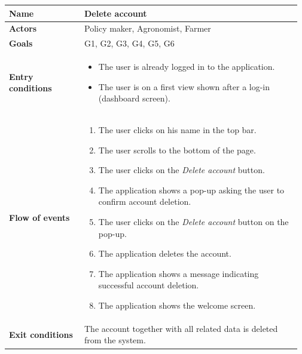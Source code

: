 \begin{table}[H]
    \centering
	\begin{tabular}{@{}p{0.25\linewidth} p{0.72\linewidth}@{}}
\toprule
		\textbf{Name}               & Delete account\\
		\midrule
		\textbf{Actors}             & Policy maker, Agronomist, Farmer\\
		\midrule
		\textbf{Goals}              & G1, G2, G3, G4, G5, G6 \\
		\midrule
		
		\textbf{Entry conditions}   & \begin{itemize}[leftmargin=.4cm,noitemsep,topsep=0pt,before=\vspace{-3mm},after=\vspace{-4mm}]
		    \item The user is already logged in to the application.
		    \item The user is on a first view shown after a log-in (dashboard screen).
		\end{itemize}\\
		\midrule
		
		\textbf{Flow of events}     & \begin{enumerate}[leftmargin=.4cm,noitemsep,topsep=0pt,before=\vspace{-3mm},after=\vspace{-4mm}]
		    \item The user clicks on his name in the top bar.
		    \item The user scrolls to the bottom of the page.
		    \item The user clicks on the \textit{Delete account} button.
		    \item The application shows a pop-up asking the user to confirm account deletion.
		    \item The user clicks on the \textit{Delete account} button on the pop-up.
		    \item The application deletes the account.
		    \item The application shows a message indicating successful account deletion.
		    \item The application shows the welcome screen.
		\end{enumerate}\\
		\midrule
		\textbf{Exit conditions}    & The account together with all related data is deleted from the system. \\
		\midrule
		

\end{tabular}
\end{table}

